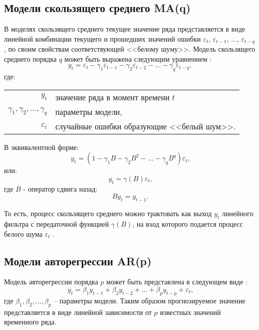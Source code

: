 \documentclass[a4paper,14pt,russian]{extreport}
\makeatletter
\newenvironment{eqwhere}
	{где:
		\par\noindent\hspace{2em}\begin{tabular}{>{$}r<{$} @{${}$ -- {}} l}
	}
	{\end{tabular}\par\vspace{\belowdisplayskip}}
\makeatother
\begin{document}
\subsection{Модели скользящего среднего MA(q)}
В моделях скользящего среднего текущее значение ряда представляется в виде 
линейной комбинации текущего и прошедших значений ошибки $\varepsilon_t$, 
$\varepsilon_{t-1}$, $...$, $\varepsilon_{t-q}$, по своим свойствам соответствующей 
<<белому шуму>>. Модель скользящего среднего порядка $q$ 
может быть выражена следующим уравнением \cite{runova2013}:
\begin{equation}
	y_t = \varepsilon_t - \gamma_1 \varepsilon_{t-1} - \gamma_2 \varepsilon_{t-2} 
		- ... - \gamma_q \varepsilon_{t-q}, 
\end{equation} 
\begin{eqwhere}
	y_t	& значение ряда в момент времени $t$ \\
	\gamma_1, \gamma_2, ..., \gamma_q 	& параметры модели, \\
	\varepsilon_t	& случайные ошибки образующие <<белый шум>>.\\
\end{eqwhere}
В эквивалентной форме:
\begin{equation}
	y_t = (1 - \gamma_1 B - \gamma_2 B^2 - ... - \gamma_q B^q)\varepsilon_t \text{,} 
\end{equation}
или:
\begin{equation}
	y_t = \gamma(B)\varepsilon_t \text{,} 
\end{equation}
где $B$ - оператор сдвига назад:
\begin{equation}
	B y_t = y_{t-1} \text{.} \nonumber
\end{equation}

То есть, процесс скользящего среднего можно трактовать как выход $y_t$ 
линейного фильтра с передаточной функцией $\gamma(B)$, на вход которого 
подается процесс белого шума $\varepsilon_t$ \cite{box2008}.


\subsection{Модели авторегрессии AR(p)}
Модель авторегрессии порядка $p$ может быть представлена в следующем 
виде \cite{runova2013}:
\begin{equation}
	y_t = \beta_1 y_{t-1} + \beta_2 y_{t-2} + ... + \beta_p y_{t-p} + \varepsilon_t \text{,} 
\end{equation}
где $\beta_1, \beta_2, ..., \beta_p$ -- параметры модели. Таким образом 
прогнозируемое значение представляется в виде линейной зависимости от $p$ 
известных значений временного ряда. 
\end{document}
